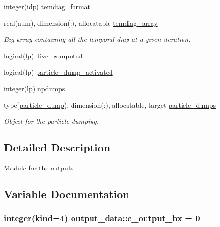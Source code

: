 \begin{DoxyCompactItemize}
\item 
integer(idp) \hyperlink{namespaceoutput__data_a2f4ce5fdd4011f5db5c6b9de97cf133a}{temdiag\+\_\+format}
\item 
real(num), dimension(\+:), allocatable \hyperlink{namespaceoutput__data_a034b19d2c3a5211b1fd96df24cd28dd1}{temdiag\+\_\+array}
\begin{DoxyCompactList}\small\item\em Big array containing all the temporal diag at a given iteration. \end{DoxyCompactList}\item 
logical(lp) \hyperlink{namespaceoutput__data_adcce4470ad25c02f78f99f1a71fc9371}{dive\+\_\+computed}
\item 
logical(lp) \hyperlink{namespaceoutput__data_a8b8e6968d2063ddada37b5d050b011b4}{particle\+\_\+dump\+\_\+activated}
\item 
integer(lp) \hyperlink{namespaceoutput__data_a1a9d2dcc12c89a8aaeb60ab9501f1008}{npdumps}
\item 
type(\hyperlink{structoutput__data_1_1particle__dump}{particle\+\_\+dump}), dimension(\+:), allocatable, target \hyperlink{namespaceoutput__data_a5fbbbcc739158cb15a4a02aa8bc63399}{particle\+\_\+dumps}
\begin{DoxyCompactList}\small\item\em Object for the particle dumping. \end{DoxyCompactList}\end{DoxyCompactItemize}


\subsection{Detailed Description}
Module for the outputs. 

\subsection{Variable Documentation}
\subsubsection[{\texorpdfstring{c\+\_\+output\+\_\+bx}{c_output_bx}}]{\setlength{\rightskip}{0pt plus 5cm}integer(kind=4) output\+\_\+data\+::c\+\_\+output\+\_\+bx = 0}\hypertarget{namespaceoutput__data_a5f179944d21e0cf92d3dc54e5ff559f6}{}\label{namespaceoutput__data_a5f179944d21e0cf92d3dc54e5ff559f6}
